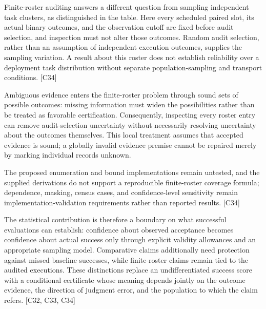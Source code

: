 \documentclass[11pt]{article}
\begin{document}
Finite-roster auditing answers a different question from sampling independent task clusters, as distinguished in the table. Here every scheduled paired slot, its actual binary outcomes, and the observation cutoff are fixed before audit selection, and inspection must not alter those outcomes. Random audit selection, rather than an assumption of independent execution outcomes, supplies the sampling variation. A result about this roster does not establish reliability over a deployment task distribution without separate population-sampling and transport conditions. [C34]

Ambiguous evidence enters the finite-roster problem through sound sets of possible outcomes: missing information must widen the possibilities rather than be treated as favorable certification. Consequently, inspecting every roster entry can remove audit-selection uncertainty without necessarily resolving uncertainty about the outcomes themselves. This local treatment assumes that accepted evidence is sound; a globally invalid evidence premise cannot be repaired merely by marking individual records unknown.

The proposed enumeration and bound implementations remain untested, and the supplied derivations do not support a reproducible finite-roster coverage formula; dependence, masking, census cases, and confidence-level sensitivity remain implementation-validation requirements rather than reported results. [C34]

The statistical contribution is therefore a boundary on what successful evaluations can establish: confidence about observed acceptance becomes confidence about actual success only through explicit validity allowances and an appropriate sampling model. Comparative claims additionally need protection against missed baseline successes, while finite-roster claims remain tied to the audited executions. These distinctions replace an undifferentiated success score with a conditional certificate whose meaning depends jointly on the outcome evidence, the direction of judgment error, and the population to which the claim refers. [C32, C33, C34]
\end{document}
